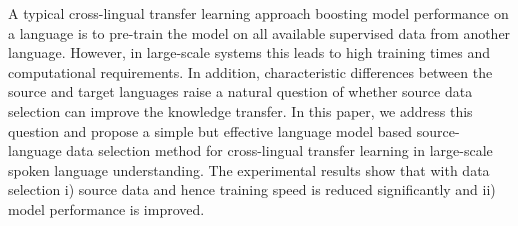 A typical cross-lingual transfer learning approach boosting model performance on a
language is to pre-train the model on all available supervised data from another language. However, in large-scale systems this leads to high training times and computational requirements. In addition, characteristic differences between the source and target languages raise a natural question of whether source data selection can improve the knowledge transfer. In this paper, we address this question and propose a simple but effective language model based source-language data selection method for cross-lingual transfer learning in large-scale spoken language understanding. The experimental results show that with data selection i) source data and hence training speed is reduced significantly
and ii) model performance is improved.